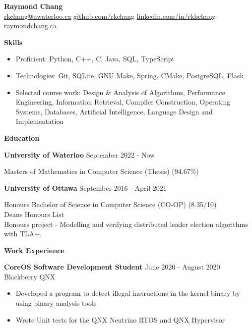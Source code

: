 \documentclass[10pt]{article}
\begin{document}
\begin{center}
    {\huge\textbf{Raymond Chang}} \\
     \href{mailto:rkchang@uwaterloo.ca}{rkchang@uwaterloo.ca}  \space\space
     \href{https://github.com/rkchang}{github.com/rkchang} \space\space
     \href{https://linkedin.com/in/rkhchang}{linkedin.com/in/rkhchang} \\
     \href{https://raymondchang.ca/}{raymondchang.ca} \\ \end{center}

{\Large\textbf{Skills}}\space \hrulefill
\begin{itemize}[noitemsep]
    \item Proficient: Python, C++, C, Java, SQL, TypeScript
    \item Technologies: Git, SQLite, GNU Make, Spring, CMake, PostgreSQL, Flask
    \item Selected course work:  Design \& Analysis of Algorithms, Performance Engineering, Information Retrieval, Compiler Construction, Operating Systems, Databases, Artificial Intelligence, Language Design and Implementation
\end{itemize}

\smallskip

{\Large\textbf{Education}}\space \hrulefill

\textbf{University of Waterloo} \hfill September 2022 - Now

Masters of Mathematics in Computer Science (Thesis) (94.67\%)

\hfill

\textbf{University of Ottawa} \hfill September 2016 - April 2021

Honours Bachelor of Science in Computer Science (CO-OP) (8.35/10) \\ Deans Honours List \\ Honours project - Modelling and verifying distributed leader election algorithms with TLA+.
\bigskip

{\Large\textbf{Work Experience}}\space \hrulefill

\textbf{CoreOS Software Development Student} \hfill June 2020 - August 2020 \\
Blackberry QNX
\begin{itemize}[noitemsep]
    \item Developed a program to detect illegal instructions in the kernel binary by using binary analysis tools
    \item Wrote Unit tests for the QNX Neutrino RTOS and QNX Hypervisor
\end{itemize}
\end{document}
